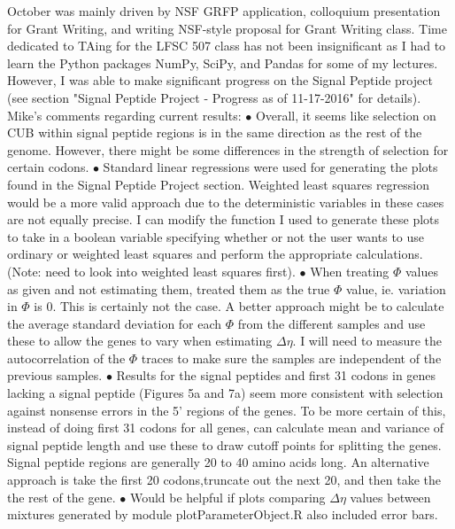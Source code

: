 \documentclass[11pt]{labbook}
\begin{document}

October was mainly driven by NSF GRFP application, colloquium presentation for Grant Writing, and writing NSF-style proposal for Grant Writing class. Time dedicated to TAing for the LFSC 507 class has not been insignificant as I had to learn the Python packages NumPy, SciPy, and Pandas for some of my lectures. 
\newline
However, I was able to make significant progress on the Signal Peptide project (see section "Signal Peptide Project - Progress as of 11-17-2016" for details).
\newline \newline
Mike's comments regarding current results: \newline
$\bullet$ Overall, it seems like selection on CUB within signal peptide regions is in the same direction as the rest of the genome. However, there might be some differences in the strength of selection for certain codons. \newline \newline
$\bullet$ Standard linear regressions were used for generating the plots found in the Signal Peptide Project section. Weighted least squares regression would be a more valid approach due to the deterministic variables in these cases are not equally precise. I can modify the function I used to generate these plots to take in a boolean variable specifying whether or not the user wants to use ordinary or weighted least squares and perform the appropriate calculations. (Note: need to look into weighted least squares first). \newline \newline
$\bullet$ When treating $\Phi$ values as given and not estimating them, treated them as the true $\Phi$ value, ie. variation in $\Phi$ is 0. This is certainly not the case. A better approach might be to calculate the average standard deviation for each $\Phi$ from the different samples and use these to allow the genes to vary when estimating $\Delta\eta$. I will need to measure the autocorrelation of the $\Phi$ traces to make sure the samples are independent of the previous samples. \newline \newline
$\bullet$ Results for the signal peptides and first 31 codons in genes lacking a signal peptide (Figures 5a and 7a) seem more consistent with selection against nonsense errors in the 5' regions of the genes. To be more certain of this, instead of doing first 31 codons for all genes, can calculate mean and variance of signal peptide length and use these to draw cutoff points for splitting the genes. Signal peptide regions are generally 20 to 40 amino acids long. An alternative approach is take the first 20 codons,truncate out the next 20, and then take the the rest of the gene. \newline \newline
$\bullet$ Would be helpful if plots comparing $\Delta\eta$ values between mixtures generated by module plotParameterObject.R also included error bars. \newline \newline
\end{document}
